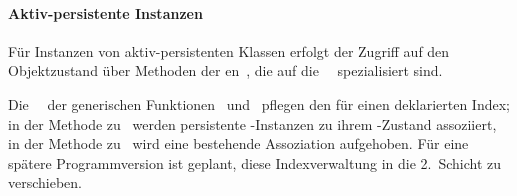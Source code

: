 \paragraph{Aktiv-persistente Instanzen}
%
F\"{u}r Instanzen von aktiv-persistenten Klassen erfolgt der Zugriff auf
den Objektzustand \"{u}ber Methoden der
\gfn[n]en\ , die auf die
\clsmc\ \ spezialisiert sind.
%
\par{}Die \spc[n]\ \mtd[n]\ der generischen Funktionen \ und
\ pflegen den f\"{u}r
einen \Slt\/ deklarierten Index; in der Methode zu \ werden persistente \clos-Instanzen zu ihrem
\Slt\/-Zustand assoziiert, in der Methode zu
\ wird eine bestehende Assoziation
aufgehoben. F\"{u}r eine sp\"{a}tere Programmversion ist geplant, diese
Indexverwaltung in die 2.~Schicht zu verschieben.
%
